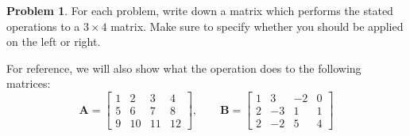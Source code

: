 \documentclass[12pt]{article}
\theoremstyle{definition}
\newtheorem{problem}{Problem}
\renewcommand{\vec}{\mathbf}
\begin{document}
\clearpage

\begin{problem}
    For each problem, write down a matrix which performs the stated operations to a $3\times 4$ matrix.
    Make sure to specify whether you should be applied on the left or right.

    For reference, we will also show what the operation does to the following matrices:
    \[
        \vec{A} = 
        \begin{bmatrix}
            1 & 2 & 3 & 4 \\
            5 & 6 & 7 & 8 \\
            9 & 10 & 11 & 12
        \end{bmatrix}
        ,\qquad 
        \vec{B} = 
        \begin{bmatrix}
            1 & 3& -2 & 0 \\
            2 & -3 & 1 & 1 \\
            2 & -2 & 5 & 4
        \end{bmatrix}
    \]


\end{problem}
\end{document}
